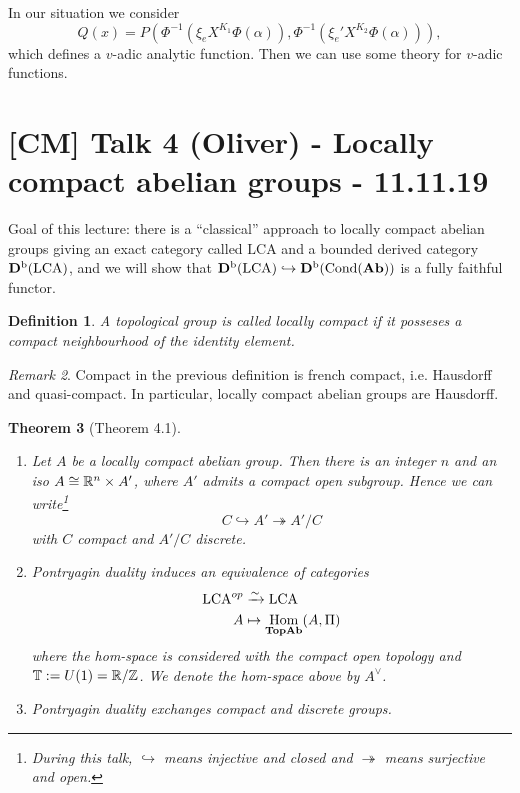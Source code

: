 \documentclass[A4paper, british, reqno]{amsart}
\theoremstyle{darkgreentheorem}
\newtheorem{thm}{Theorem}[section]
\theoremstyle{darkbluedefinition}
\newtheorem{defn}[thm]{Definition}
\theoremstyle{darkredexample}
\theoremstyle{remark}
\newtheorem{rem}[thm]{Remark}
\DeclareMathOperator{\Hom}{Hom}
\DeclareMathOperator{\Cond}{Cond}
\newcommand{\1}{\mathbbm{1}}
\newcommand{\dual}{^{\vee}}
\newcommand{\tms}{\times}
\newcommand{\epi}{\twoheadrightarrow}
\newcommand{\mono}{\hookrightarrow}
\newcommand{\LCA}{\mathrm{LCA}}
\begin{document}
In our situation we consider
\[ Q(x)=P(\Phi^{-1}(\xi_{e}X^{K_{1}}\Phi(\alpha)),\Phi^{-1}(\xi_{e}'X^{K_{2}}\Phi(\alpha))),\]
which defines a $v$-adic analytic function.
Then we can use some theory for $v$-adic functions.

\section{[CM] Talk 4 (Oliver) - Locally compact abelian groups - 11.11.19}

Goal of this lecture: there is a ``classical'' approach to locally compact abelian groups giving an exact category called $\LCA$ and a bounded derived category $\Db(\LCA)$, and we will show that $\Db(\LCA)\mono \Db(\Cond(\Ab))$ is a fully faithful functor.

\begin{defn}
    A topological group is called \textit{locally compact} if it posseses a compact neighbourhood of the identity element.
\end{defn}

\begin{rem}
    Compact in the previous definition is french compact, i.e. Hausdorff and quasi-compact.
    In particular, locally compact abelian groups are Hausdorff.
\end{rem}

\begin{thm}[Theorem 4.1]
    \begin{enumerate}[label=\roman*)]
	\item Let $A$ be a locally compact abelian group.
	    Then there is an integer $n$ and an iso $A\cong \R^{n}\tms A'$, where $A'$ admits a compact open subgroup.
	    Hence we can write\footnote{During this talk, $\mono$ means injective and closed and $\epi$ means surjective and open.}
	    \[ C\mono A'\epi A'/C \]
	    with $C$ compact and $A'/C$ discrete.
	\item Pontryagin duality induces an equivalence of categories
	    \begin{align*}
		\LCA^{op}&\xrightarrow{\sim} \LCA \\
		A & \mapsto \Hom_{\Top\Ab}(A,\Pi)
	    \end{align*}
	    where the hom-space is considered with the compact open topology and $\mathbb{T}:=U(1)=\mathbb{R}/\mathbb{Z}$.
	    We denote the hom-space above by $A\dual$.
	\item Pontryagin duality exchanges compact and discrete groups.
    \end{enumerate}
\end{thm}
\end{document}

